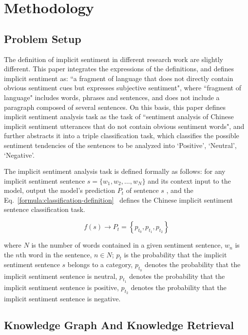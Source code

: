 \section{Methodology}

\subsection{Problem Setup}

The definition of implicit sentiment in different research work \cite{PanDongXing2020,samuel2022direct,wang2020chinese} are slightly different. This paper integrates the expressions of the definitions, and defines implicit sentiment as: ``a fragment of language that does not directly contain obvious sentiment cues but expresses subjective sentiment", where ``fragment of language" includes words, phrases and sentences, and does not include a paragraph composed of several sentences. On this basis, this paper defines implicit sentiment analysis task as the task of ``sentiment analysis of Chinese implicit sentiment utterances that do not contain obvious sentiment words", and further abstracts it into a triple classification task, which classifies the possible sentiment tendencies of the sentences to be analyzed into `Positive', `Neutral', `Negative'.

The implicit sentiment analysis task is defined formally as follows: for any implicit sentiment sentence $ s = \{w_1,w_2,\dots,w_N\}$ and its context input to the model, output the model's prediction $P_t$ of sentence $s$ , and the Eq.~\ref{formula:classification-definition}~ defines the Chinese implicit sentiment sentence classification task.

\begin{equation}
    f(s) \rightarrow P_t=\left\{p_{t_0}, p_{t_1}, p_{t_2}\right\}\label{formula:classification-definition}
\end{equation}

where $N$ is the number of words contained in a given sentiment sentence, $w_n$ is the $n$th word in the sentence, $ n \in N $; $p_t$ is the probability that the implicit sentiment sentence $s$ belongs to a category, $p_{t_0}$ denotes the probability that the implicit sentiment sentence is neutral, $p_{t_1}$ denotes the probability that the implicit sentiment sentence is positive, $p_{t_2 }$ denotes the probability that the implicit sentiment sentence is negative.

\subsection{Knowledge Graph And Knowledge Retrieval}

